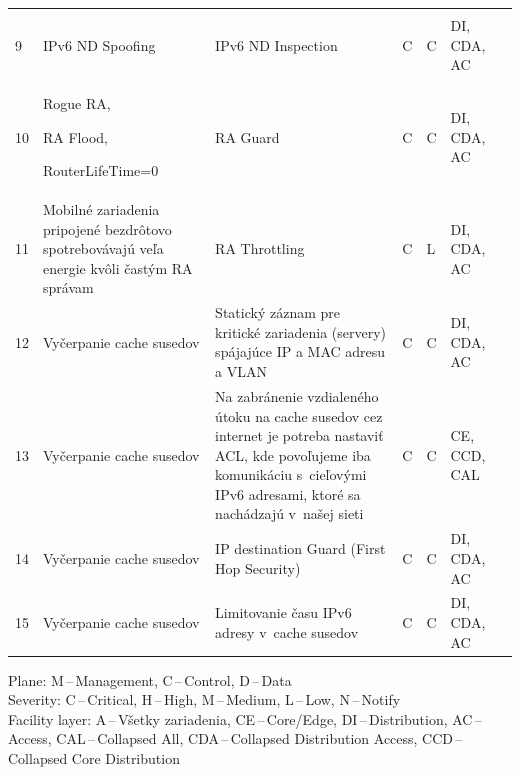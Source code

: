 \begin{longtable}[!htbp]{|C{2.5em}L{11em}L{11em}C{2.5em}C{4em}C{5em}L{2.5em}|}
	\cite{zXCpMaLbN1J7D1z2}\\
	 9	&IPv6 ND Spoofing	&IPv6 ND Inspection	&C	&C	&DI,
	CDA,
	AC	&\cite{Podermanski1222015}
	
	\cite{Gregr522015}
	
	\cite{zXCpMaLbN1J7D1z2}\\
	10	&Rogue RA,
	
	RA Flood,
	
	RouterLifeTime=0
	&RA Guard	&C	&C	&DI,
	CDA,
	AC	&\cite{Podermanski1222015}
	
	\cite{Gregr522015}
	
	\cite{zXCpMaLbN1J7D1z2}\\
	 11	&Mobilné zariadenia pripojené bezdrôtovo spotrebovávajú veľa energie kvôli častým RA správam	&RA Throttling	&C	&L	&DI,
	CDA,
	AC	& \cite{Podermanski532015}
	
	\cite{o31nYG4kn98wWNRS}\\
	12	&Vyčerpanie cache susedov	&Statický záznam pre kritické zariadenia (servery) spájajúce IP a MAC adresu a VLAN
	&C	&C	&DI,
	CDA,
	AC	&\cite{Podermanski1232015}
	
	\cite{Podermanski1932015}
	\\
	 13	&Vyčerpanie cache susedov	&Na zabránenie vzdialeného útoku na cache susedov cez internet je potreba nastaviť ACL, kde povoľujeme iba komunikáciu s~cieľovými IPv6 adresami, ktoré sa nachádzajú v~našej sieti	&C	&C	&CE,
	CCD,
	CAL	&\cite{Podermanski1232015}
	
	\cite{Podermanski1932015}
	\\
	14	&Vyčerpanie cache susedov	&IP destination Guard (First Hop Security)
	
	
	&C	&C	&DI,
	CDA,
	AC	&\cite{Podermanski1232015}
	
	\cite{Podermanski1932015}
	\\
	 15	&Vyčerpanie cache susedov	&Limitovanie času IPv6 adresy v~cache susedov	&C	&C	&DI,
	CDA,
	AC	&\cite{Podermanski1232015}
	
	\cite{Podermanski1932015}\\ 
	\hline
\end{longtable}%
\vspace{-1em}
{\tiny 
	\noindent
	Plane: M\,--\,Management, C\,--\,Control, D\,--\,Data\\
	Severity: C\,--\,Critical, H\,--\,High, M\,--\,Medium, L\,--\,Low, N\,--\,Notify\\
	Facility layer: A\,--\,Všetky zariadenia, CE\,--\,Core/Edge, DI\,--\,Distribution, AC\,--\,Access, CAL\,--\,Collapsed All, CDA\,--\,Collapsed Distribution Access, CCD\,--\,Collapsed Core Distribution}


